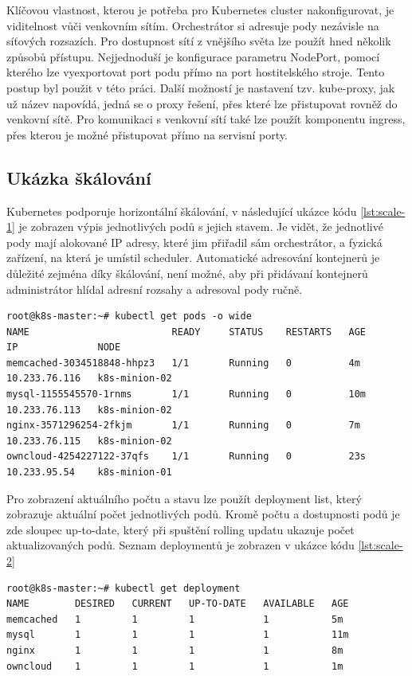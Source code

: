 Klíčovou vlastnost, kterou je potřeba pro Kubernetes cluster nakonfigurovat, je viditelnost vůči venkovním sítím. Orchestrátor si adresuje pody nezávisle na síťových rozsazích. Pro dostupnost sítí z vnějšího světa lze použít hned několik způsobů přístupu. Nejjednoduší je konfigurace parametru NodePort, pomocí kterého lze vyexportovat port podu přímo na port hostitelského stroje. Tento postup byl použit v této práci. Další možností je nastavení tzv. kube-proxy, jak už název napovídá, jedná se o proxy řešení, přes které lze přistupovat rovněž do venkovní sítě. Pro komunikaci s venkovní sítí také lze použít komponentu ingress, přes kterou je možné přistupovat přímo na servisní porty. 

\subsection{Ukázka škálování}
Kubernetes podporuje horizontální škálování, v následující ukázce kódu \ref{lst:scale-1} je zobrazen výpis jednotlivých podů s jejich stavem. Je vidět, že jednotlivé pody mají alokované IP adresy, které jim přiřadil sám orchestrátor, a fyzická zařízení, na která je umístil scheduler. Automatické adresování kontejnerů je důležité zejména díky škálování, není možné, aby při přidávaní kontejnerů administrátor hlídal adresní rozsahy a adresoval pody ručně. 

\begin{lstlisting}[caption={Ukázka škálování, čast 1},label= {lst:scale-1}]
root@k8s-master:~# kubectl get pods -o wide
NAME                         READY     STATUS    RESTARTS   AGE       IP              NODE
memcached-3034518848-hhpz3   1/1       Running   0          4m        10.233.76.116   k8s-minion-02
mysql-1155545570-1rnms       1/1       Running   0          10m       10.233.76.113   k8s-minion-02
nginx-3571296254-2fkjm       1/1       Running   0          7m        10.233.76.115   k8s-minion-02
owncloud-4254227122-37qfs    1/1       Running   0          23s       10.233.95.54    k8s-minion-01
\end{lstlisting}

Pro zobrazení aktuálního počtu a stavu lze použít deployment list, který zobrazuje aktuální počet jednotlivých podů. Kromě počtu a dostupnosti podů je zde sloupec up-to-date, který při spuštění rolling updatu ukazuje počet aktualizovaných podů. Seznam deploymentů je zobrazen v ukázce kódu \ref{lst:scale-2}

\begin{lstlisting}[caption={Ukázka škálování, čast 2},label= {lst:scale-2}]
root@k8s-master:~# kubectl get deployment 
NAME        DESIRED   CURRENT   UP-TO-DATE   AVAILABLE   AGE
memcached   1         1         1            1           5m
mysql       1         1         1            1           11m
nginx       1         1         1            1           8m
owncloud    1         1         1            1           1m
\end{lstlisting}


